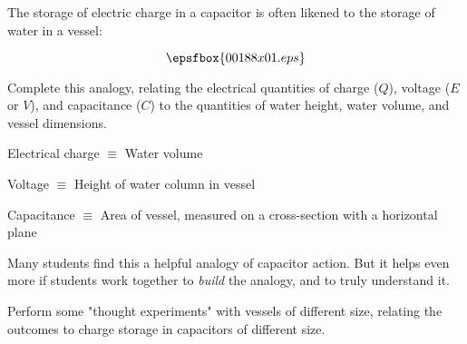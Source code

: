 

The storage of electric charge in a capacitor is often likened to the storage of water in a vessel:

$$\epsfbox{00188x01.eps}$$

Complete this analogy, relating the electrical quantities of charge ($Q$), voltage ($E$ or $V$), and capacitance ($C$) to the quantities of water height, water volume, and vessel dimensions.







Electrical charge $\equiv$ Water volume

Voltage $\equiv$ Height of water column in vessel

Capacitance $\equiv$ Area of vessel, measured on a cross-section with a horizontal plane







Many students find this a helpful analogy of capacitor action.  But it helps even more if students work together to {\it build} the analogy, and to truly understand it.

Perform some "thought experiments" with vessels of different size, relating the outcomes to charge storage in capacitors of different size.





